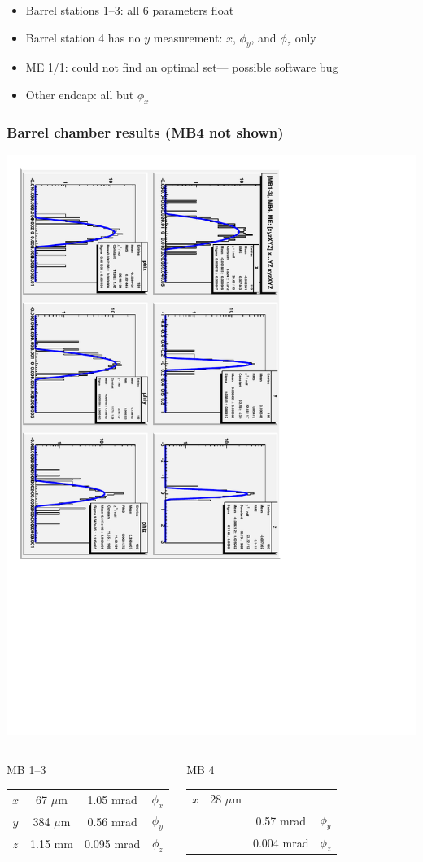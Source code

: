 \documentclass[compress]{beamer}
\begin{document}
\begin{frame}
\begin{itemize}
\item Barrel stations 1--3: all 6 parameters float
\item Barrel station 4 has no $y$ measurement: $x$, $\phi_y$, and $\phi_z$ only
\item ME 1/1: could not find an optimal set--- possible software bug
\item Other endcap: all but $\phi_x$
\end{itemize}
\end{frame}

\begin{frame}
\frametitle{Barrel chamber results \hfill {\small (MB4 not shown)}}
\vspace{-0.25 cm}
\begin{center}
\includegraphics[height=0.7\linewidth, angle=90]{optimal_barrel_alignment.pdf}
\end{center}

\vspace{-0.75 cm}
\begin{columns}
\begin{center}
MB 1--3
\begin{tabular}{c c | c c}
\hline\hline
$x$ & 67 $\mu$m & 1.05 mrad & $\phi_x$ \\
$y$ & 384 $\mu$m & 0.56 mrad & $\phi_y$ \\
$z$ & 1.15 mm & 0.095 mrad & $\phi_z$ \\
\hline\hline
\end{tabular}
\end{center}

\begin{center}
MB 4
\begin{tabular}{c c | c c}
\hline\hline
$x$ & 28 $\mu$m &  \\
    &           & 0.57 mrad & $\phi_y$ \\
    &           & 0.004 mrad & $\phi_z$ \\
\hline\hline
\end{tabular}
\end{center}
\end{columns}
\end{frame}
\end{document}
